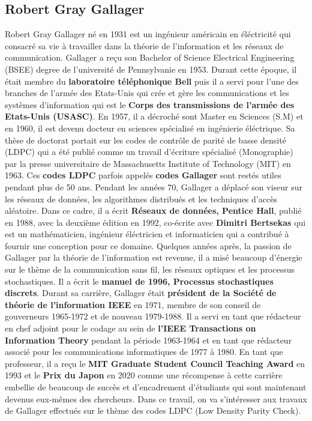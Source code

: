 \documentclass[french,nochapter,11pt]{rapportUB}
\begin{document}
\subsection{Robert Gray Gallager}
Robert Gray Gallager né en 1931 est un ingénieur américain en éléctricité qui consacré sa vie à travailler dans la théorie de l'information et les réseaux de communication. \newline
Gallager a reçu son Bachelor of Science Electrical Engineering (BSEE) degree de l'université de Pennsylvanie en 1953. Durant cette époque, il était membre du \textbf{laboratoire téléphonique Bell} puis il a servi pour l'une des branches de l'armée des Etats-Unis qui crée et gère les communications et les systèmes d'information qui est le \textbf{Corps des transmissions de l'armée des Etats-Unis (USASC)}. En 1957, il a décroché sont Master en Sciences (S.M) et en 1960, il est devenu docteur en sciences spécialisé en ingénierie éléctrique. \newline
Sa thèse de doctorat portait sur les codes de contrôle de parité de basse densité (LDPC) qui a été publié comme un travail d'écriture spécialisé (Monographie) par la presse universitaire de Massachusetts Institute of Technology (MIT) en 1963. Ces \textbf{codes LDPC} parfois appelés \textbf{codes Gallager} sont restés utiles pendant plus de 50 ans. \newline
Pendant les années 70, Gallager a déplacé son viseur sur les réseaux de données, les algorithmes distribués et les techniques d'accès aléatoire. Dans ce cadre, il a écrit \textbf{Réseaux de données, Pentice Hall}, publié en 1988, avec la deuxième édition en 1992, co-écrite avec \textbf{Dimitri Bertsekas} qui est un mathématicien, ingénieur éléctricien et informaticien qui a contribué à fournir une conception pour ce domaine. \newline
Quelques années après, la passion de Gallager par la théorie de l'information est revenue, il a misé beaucoup d'énergie sur le thème de la communication sans fil, les réseaux optiques et les processus stochastiques. Il a écrit le \textbf{manuel de 1996, Processus stochastiques discrets}.\newline
Durant sa carrière, Gallager était \textbf{président de la Société de théorie de l'information IEEE} en 1971, membre de son conseil de gouverneurs 1965-1972 et de nouveau 1979-1988. Il a servi en tant que rédacteur en chef adjoint pour le codage au sein de \textbf{l'IEEE Transactions on Information Theory} pendant la période 1963-1964 et en tant que rédacteur associé pour les communications informatiques de 1977 à 1980. \newline
En tant que professeur, il a reçu le \textbf{MIT Graduate Student Council Teaching Award} en 1993 et le \textbf{Prix du Japon} en 2020 comme une récompense à cette carrière embellie de beaucoup de succès et d'encadrement d'étudiants qui sont maintenant devenus eux-mêmes des chercheurs. \newline
Dans ce travail, on va s'intéresser aux travaux de Gallager effectués sur le thème des codes LDPC (Low Density Parity Check). \newline
 
\end{document}
